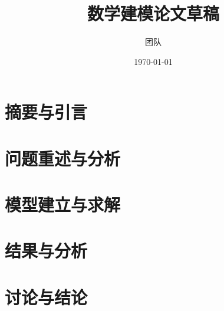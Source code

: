 \documentclass[12pt,a4paper]{article}
\title{数学建模论文草稿}
\author{团队}
\date{\today}
\begin{document}
\maketitle

\section{摘要与引言}
\section{问题重述与分析}
\section{模型建立与求解}
\section{结果与分析}
\section{讨论与结论}


\end{document}
